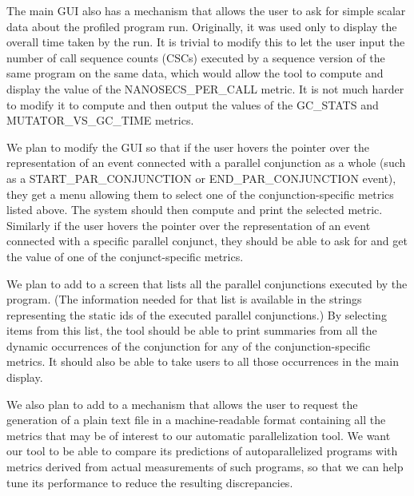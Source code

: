 The main \tscope GUI also has a mechanism that allows the user
to ask for simple scalar data about the profiled program run.
Originally, it was used only to display the overall time taken by the run.
It is trivial to modify this to let the user input
the number of call sequence counts (CSCs)
executed by a sequence version of the same program on the same data,
which would allow the tool to compute and display
the value of the NANOSECS\_PER\_CALL metric.
It is not much harder to modify it to compute and then output
the values of the GC\_STATS and MUTATOR\_VS\_GC\_TIME metrics.

We plan to modify the \tscope GUI so that
if the user hovers the pointer over the representation
of an event connected with a parallel conjunction as a whole
(such as a START\_PAR\_CONJUNCTION or END\_PAR\_CONJUNCTION event),
they get a menu allowing them to select
one of the conjunction-specific metrics listed above.
The system should then compute and print the selected metric.
Similarly if the user hovers the pointer over the representation
of an event connected with a specific parallel conjunct,
they should be able to ask for and get
the value of one of the conjunct-specific metrics.

We plan to add to \tscope a screen
that lists all the parallel conjunctions executed by the program.
(The information needed for that list is available in the strings
representing the static ids of the executed parallel conjunctions.)
By selecting items from this list,
the tool should be able to print summaries
from all the dynamic occurrences of the conjunction
for any of the conjunction-specific metrics.
It should also be able to take users
to all those occurrences in the main display.

We also plan to add to \tscope
a mechanism that allows the user to request
the generation of a plain text file in a machine-readable format
containing all the metrics that may be of interest
to our automatic parallelization tool.
We want our tool to be able to compare
its predictions of autoparallelized programs
with metrics derived from actual measurements of such programs,
so that we can help tune its performance to reduce the resulting discrepancies.

